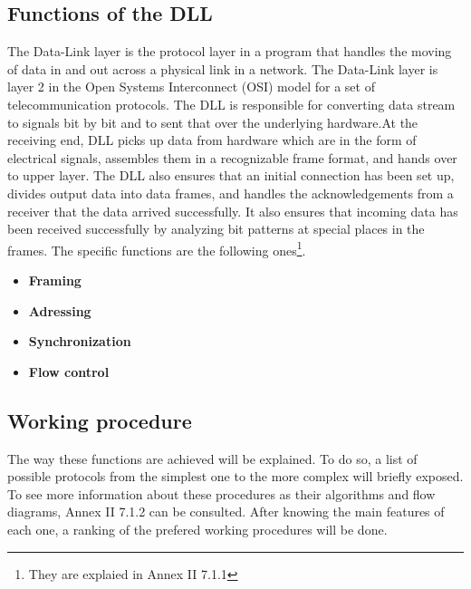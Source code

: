 %
\subsection{Functions of the DLL}
The Data-Link layer is the protocol layer in a program that handles the moving of data in and out across a physical link in a network. The Data-Link layer is layer 2 in the Open Systems Interconnect (OSI) model for a set of telecommunication protocols.
The DLL is responsible for converting data stream to signals bit by bit and to sent that over the underlying hardware.At the receiving end, DLL picks up data from hardware which are in the form of electrical signals, assembles them in a recognizable frame format, and hands over to upper layer. The DLL also ensures that an initial connection has been set up, divides output data into data frames, and handles the acknowledgements from a receiver that the data arrived successfully. It also ensures that incoming data has been received successfully by analyzing bit patterns at special places in the frames. The specific functions are the following ones\footnote{They are explaied in Annex II 7.1.1}.
\begin{itemize}
\item \textbf{Framing}
\item \textbf{Adressing}
\item \textbf{Synchronization}
\item \textbf{Flow control}
 \end{itemize}
\subsection{Working procedure}
The way these functions are achieved will be explained. To do so, a list of possible protocols from the simplest one to the more complex will briefly exposed. To see more information about these procedures as their algorithms and flow diagrams, Annex II 7.1.2 can be consulted. After knowing the main features of each one, a ranking of the prefered working procedures will be done. 
